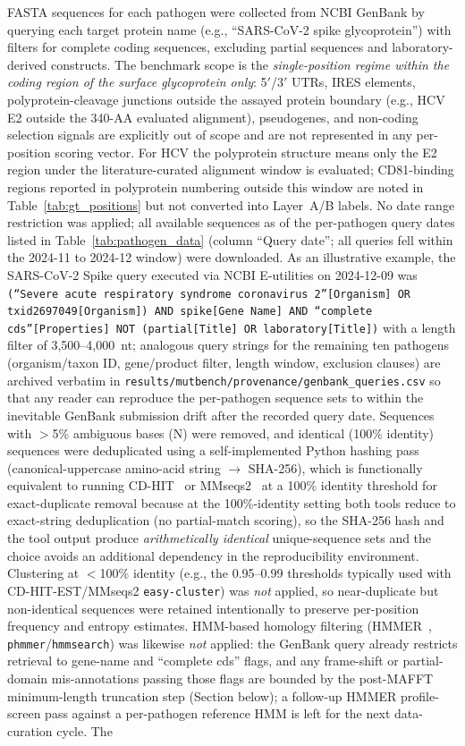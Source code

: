 \medskip
FASTA sequences for each pathogen were collected from NCBI GenBank by querying each target protein name (e.g., ``SARS-CoV-2 spike glycoprotein'') with filters for complete coding sequences, excluding partial sequences and laboratory-derived constructs. The benchmark scope is the \emph{single-position regime within the coding region of the surface glycoprotein only}: 5$'$/3$'$ UTRs, IRES elements, polyprotein-cleavage junctions outside the assayed protein boundary (e.g., HCV E2 outside the 340-AA evaluated alignment), pseudogenes, and non-coding selection signals are explicitly out of scope and are not represented in any per-position scoring vector. For HCV the polyprotein structure means only the E2 region under the literature-curated alignment window is evaluated; CD81-binding regions reported in polyprotein numbering outside this window are noted in Table~\ref{tab:gt_positions} but not converted into Layer~A/B labels. No date range restriction was applied; all available sequences as of the per-pathogen query dates listed in Table~\ref{tab:pathogen_data} (column ``Query date''; all queries fell within the 2024-11 to 2024-12 window) were downloaded. As an illustrative example, the SARS-CoV-2 Spike query executed via NCBI E-utilities on 2024-12-09 was \texttt{(``Severe acute respiratory syndrome coronavirus 2''[Organism] OR txid2697049[Organism]) AND spike[Gene Name] AND ``complete cds''[Properties] NOT (partial[Title] OR laboratory[Title])} with a length filter of 3{,}500--4{,}000~nt; analogous query strings for the remaining ten pathogens (organism/taxon ID, gene/product filter, length window, exclusion clauses) are archived verbatim in \texttt{results/mutbench/provenance/genbank\_queries.csv} so that any reader can reproduce the per-pathogen sequence sets to within the inevitable GenBank submission drift after the recorded query date. Sequences with $>$5\% ambiguous bases (N) were removed, and identical (100\% identity) sequences were deduplicated using a self-implemented Python hashing pass (canonical-uppercase amino-acid string $\to$ SHA-256), which is functionally equivalent to running CD-HIT~\cite{fu2012cdhit} or MMseqs2~\cite{steinegger2017mmseqs2} at a 100\% identity threshold for exact-duplicate removal because at the 100\%-identity setting both tools reduce to exact-string deduplication (no partial-match scoring), so the SHA-256 hash and the tool output produce \emph{arithmetically identical} unique-sequence sets and the choice avoids an additional dependency in the reproducibility environment. Clustering at $<$100\% identity (e.g., the 0.95--0.99 thresholds typically used with CD-HIT-EST/MMseqs2 \texttt{easy-cluster}) was \emph{not} applied, so near-duplicate but non-identical sequences were retained intentionally to preserve per-position frequency and entropy estimates. HMM-based homology filtering (HMMER~\cite{eddy2011hmmer}, \texttt{phmmer}/\texttt{hmmsearch}) was likewise \emph{not} applied: the GenBank query already restricts retrieval to gene-name and ``complete cds'' flags, and any frame-shift or partial-domain mis-annotations passing those flags are bounded by the post-MAFFT minimum-length truncation step (Section below); a follow-up HMMER profile-screen pass against a per-pathogen reference HMM is left for the next data-curation cycle. The 